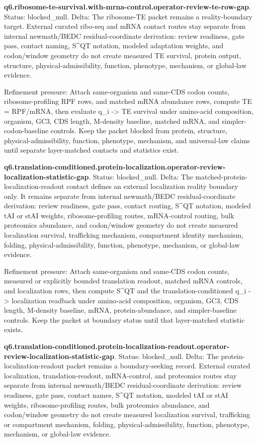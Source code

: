 \textbf{q6.ribosome-te-survival.with-mrna-control.operator-review-te-row-gap}. Status: blocked\_null. Delta: The ribosome-TE packet remains a reality-boundary target. External curated ribo-seq and mRNA contact routes stay separate from internal newmath/BEDC residual-coordinate derivation: review readiness, gate pass, contact naming, S\textasciicircum{}QT notation, modeled adaptation weights, and codon/window geometry do not create measured TE survival, protein output, structure, physical-admissibility, function, phenotype, mechanism, or global-law evidence.

Refinement pressure: Attach same-organism and same-CDS codon counts, ribosome-profiling RPF rows, and matched mRNA abundance rows, compute TE = RPF/mRNA, then evaluate q\_i -> TE survival under amino-acid composition, organism, GC3, CDS length, M-density baseline, matched mRNA, and simpler-codon-baseline controls. Keep the packet blocked from protein, structure, physical-admissibility, function, phenotype, mechanism, and universal-law claims until separate layer-matched contacts and statistics exist.

\textbf{q6.translation-conditioned.protein-localization.operator-review-localization-statistic-gap}. Status: blocked\_null. Delta: The matched-protein-localization-readout contact defines an external localization reality boundary only. It remains separate from internal newmath/BEDC residual-coordinate derivation: review readiness, gate pass, contact routing, S\textasciicircum{}QT notation, modeled tAI or stAI weights, ribosome-profiling routes, mRNA-control routing, bulk proteomics abundance, and codon/window geometry do not create measured localization survival, trafficking mechanism, compartment identity mechanism, folding, physical-admissibility, function, phenotype, mechanism, or global-law evidence.

Refinement pressure: Attach same-organism and same-CDS codon counts, measured or explicitly bounded translation readout, matched mRNA controls, and localization rows, then compute S\textasciicircum{}QT and the translation-conditioned q\_i -> localization readback under amino-acid composition, organism, GC3, CDS length, M-density baseline, mRNA, protein-abundance, and simpler-baseline controls. Keep the packet at boundary status until that layer-matched statistic exists.

\textbf{q6.translation-conditioned.protein-localization-readout.operator-review-localization-statistic-gap}. Status: blocked\_null. Delta: The protein-localization-readout packet remains a boundary-seeking record. External curated localization, translation-readout, mRNA-control, and proteomics routes stay separate from internal newmath/BEDC residual-coordinate derivation: review readiness, gate pass, contact names, S\textasciicircum{}QT notation, modeled tAI or stAI weights, ribosome-profiling routes, bulk proteomics abundance, and codon/window geometry do not create measured localization survival, trafficking or compartment mechanism, folding, physical-admissibility, function, phenotype, mechanism, or global-law evidence.

